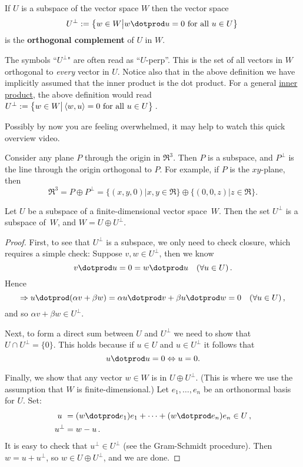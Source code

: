 \begin{definition}
If $U$ is a subspace of the vector space $W$ then the vector space 
\[U^\perp := \big\{w\in W \big| w\dotprod u=0 \text{ for all } u\in U\big\}\, \]
is the {\bfseries orthogonal complement} of $U$ in $W$. 
\end{definition}


\begin{remark}
The symbols ``$U^\perp$" are often read as ``$U$-perp''.  This is the set of all vectors in $W$ orthogonal to \emph{every} vector in $U$. 
Notice also that in the above definition we have implicitly assumed that the inner product is the dot product. For a general \hyperlink{inner_product}{inner product}, the  
above definition would read $U^\perp := \big\{w\in W \big|\,  \langle w,u\rangle=0 \ {\rm  for\  all } \ u\in U\big\}\, $.
\end{remark}
Possibly by now you are feeling overwhelmed, it may help to watch this quick overview video.




\begin{example}
Consider any plane $P$ through the origin in $\Re^3$.  Then $P$ is a subspace, and $P^\perp$ is the line through the origin orthogonal to $P$.  For example, if $P$ is the $xy$-plane, then
\[
\Re^3=P\oplus P^\perp=\{(x,y,0)| x,y\in \Re \} \oplus \{(0,0,z)| z\in \Re \}.
\]
\end{example}

\begin{theorem}
Let $U$ be a subspace of a finite-dimensional vector space~$W$.  Then the set $U^\perp$ is a subspace of~$W$, and $W=U\oplus U^\perp$.
\end{theorem}

\begin{proof}
First, to see that $U^\perp$ is a subspace, we only need to check closure, which requires a simple check:
Suppose $v,w\in U^\perp$, then we know  \[v\dotprod u = 0 = w\dotprod u \quad (\forall u\in U)\, .\]
Hence
\[\Rightarrow u\dotprod(\alpha v+\beta w)= \alpha u\dotprod v + \beta u\dotprod w =0\quad (\forall u\in U)\, ,\] 
and so $\alpha v+\beta w\in U^\perp$.

Next, to form a direct sum between $U$ and $U^\perp$ we need to show
that $U\cap U^\perp=\{0\}$. This holds because if $u\in U$ and $u\in U^\perp$ it follows that
\[
u\dotprod u = 0 \Leftrightarrow u=0.
\]

Finally, we show that any vector $w\in W$ is in $U\oplus U^\perp$.  (This is where we use the assumption that $W$ is finite-dimensional.)  Let $e_1, \ldots, e_n$ be an orthonormal basis for $U$.  Set: 
\begin{align*}
u\ &=(w\dotprod e_1)e_1 + \cdots + (w\dotprod e_n)e_n \in U\, ,\\
u^\perp&= w-u\, .
\end{align*}
It is easy to check that $u^\perp \in U^\perp$ (see the Gram-Schmidt procedure).  Then $w=u+u^\perp$, so $w\in U\oplus U^\perp$, and we are done.
\end{proof}

